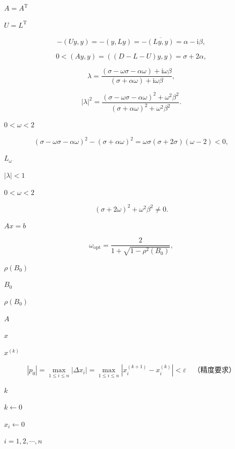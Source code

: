 \documentclass[UTF8,fontset=fandol]{ctexart}
\begin{document}
$A=A^{\mathrm T}$\par

$U=L^{\mathrm T}$\par

\[
-(Uy,y)=-(y,Ly)=-\overline{(Ly,y)}=\alpha-\mathrm i\beta,
\]

\[
0<(Ay,y)=((D-L-U)y,y)=\sigma+2\alpha,
\tag{8.4.10}
\]

\[
\lambda=\frac{(\sigma-\omega\sigma-\alpha\omega)+\mathrm i\omega\beta}{(\sigma+\alpha\omega)+\mathrm i\omega\beta},
\]

\[
|\lambda|^2=\frac{(\sigma-\omega\sigma-\alpha\omega)^2+\omega^2\beta^2}{(\sigma+\alpha\omega)^2+\omega^2\beta^2}.
\]

$0<\omega<2$\par

\[
(\sigma-\omega\sigma-\alpha\omega)^2-(\sigma+\alpha\omega)^2
=\omega\sigma(\sigma+2\sigma)(\omega-2)<0,
\]

$L_\omega$\par

$|\lambda|<1$\par

$0<\omega<2$\par

\[
(\sigma+2\omega)^2+\omega^2\beta^2\neq0.
\]

$Ax=b$\par

\[
\omega_{\mathrm{opt}}=\frac2{1+\sqrt{1-\rho^2(B_0)}},
\]

$\rho(B_0)$\par

$B_0$\par

$\rho(B_0)$\par

$A$\par

$x$\par

$x^{(k)}$\par

\[
|p_0|=\max_{1\leqslant i\leqslant n}|\Delta x_i|=\max_{1\leqslant i\leqslant n}|x_i^{(k+1)}-x_i^{(k)}|<\varepsilon\quad\text{（精度要求）}
\]

$k$\par

$k\leftarrow0$\par

$x_i\leftarrow0$\par

$i=1,2,\cdots,n$\par
\end{document}
